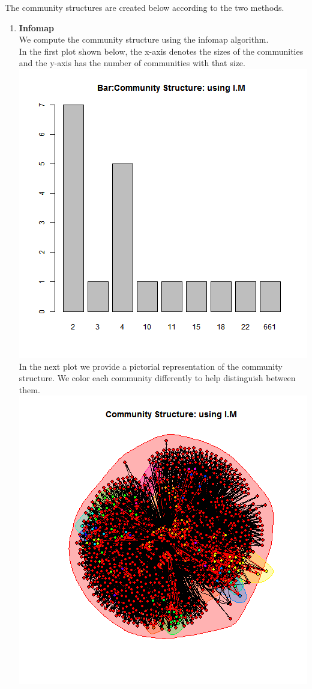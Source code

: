 \documentclass{article}
\begin{document}
The community structures are created below according to the two methods.\\
\begin{enumerate}
 \item \textbf{Infomap}\\
 We compute the community structure using the infomap algorithm.\\
 In the first plot shown below, the x-axis denotes the sizes of the communities and the y-axis has the number of communities with that size.\\
	\includegraphics[scale=0.4]{7b} \\
	In the next plot we provide a pictorial representation of the community structure.
	We color each community differently to help distinguish between them.\\
	\includegraphics[scale=0.7]{7c} \\ 


\end{enumerate}
\end{document}
